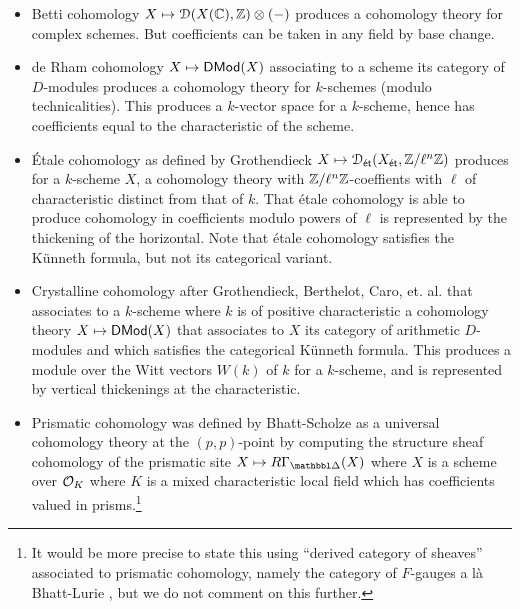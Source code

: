 \begin{itemize}
    \item Betti cohomology $X\mapsto\EuScript{D}(X(\mathbb{C}),\mathbb{Z})\otimes(-)$ produces a cohomology theory for complex schemes. But coefficients can be taken in any field by base change. 
    \item de Rham cohomology $X\mapsto\mathsf{DMod}(X)$ associating to a scheme its category of $D$-modules produces a cohomology theory for $k$-schemes (modulo technicalities). This produces a $k$-vector space for a $k$-scheme, hence has coefficients equal to the characteristic of the scheme. 
    \item \'{E}tale cohomology as defined by Grothendieck $X\mapsto\EuScript{D}_{\mathsf{\acute{e}t}}(X_{\mathsf{\acute{e}t}},\mathbb{Z}/\ell^{n}\mathbb{Z})$ produces for a $k$-scheme $X$, a cohomology theory with $\mathbb{Z}/\ell^{n}\mathbb{Z}$-coeffients with $\ell$ of characteristic distinct from that of $k$. That \'{e}tale cohomology is able to produce cohomology in coefficients modulo powers of $\ell$ is represented by the thickening of the horizontal. Note that \'{e}tale cohomology satisfies the K\"{u}nneth formula, but not its categorical variant. 
    \item Crystalline cohomology after Grothendieck, Berthelot, Caro, et. al. that associates to a $k$-scheme where $k$ is of positive characteristic a cohomology theory $X\mapsto\mathsf{DMod}(X)$ that associates to $X$ its category of arithmetic $D$-modules and which satisfies the categorical K\"{u}nneth formula. This produces a module over the Witt vectors $W(k)$ of $k$ for a $k$-scheme, and is represented by vertical thickenings at the characteristic. 
    \item Prismatic cohomology was defined by Bhatt-Scholze \cite{PrismsPrismatic} as a universal cohomology theory at the $(p,p)$-point by computing the structure sheaf cohomology of the prismatic site $X\mapsto R\Gamma_{\prism}(X)$ where $X$ is a scheme over $\mathcal{O}_{K}$ where $K$ is a mixed characteristic local field which has coefficients valued in prisms.\footnote{It would be more precise to state this using ``derived category of sheaves'' associated to prismatic cohomology, namely the category of $F$-gauges a l\`{a} Bhatt-Lurie \cite{FGauges}, but we do not comment on this further.}
\end{itemize}
